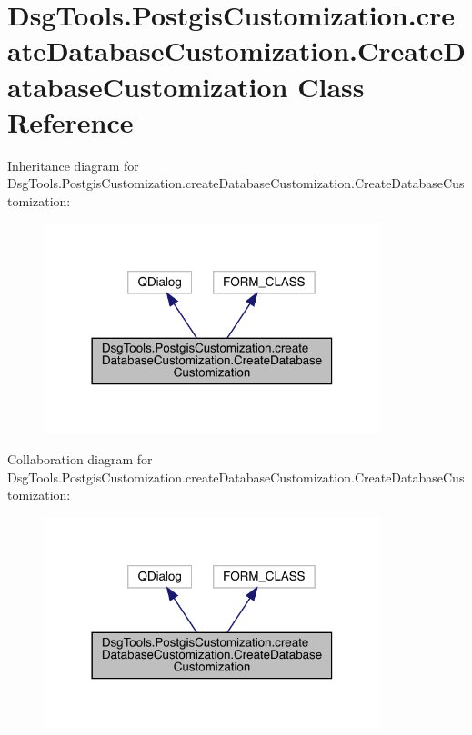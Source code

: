 \hypertarget{class_dsg_tools_1_1_postgis_customization_1_1create_database_customization_1_1_create_database_customization}{}\section{Dsg\+Tools.\+Postgis\+Customization.\+create\+Database\+Customization.\+Create\+Database\+Customization Class Reference}
\label{class_dsg_tools_1_1_postgis_customization_1_1create_database_customization_1_1_create_database_customization}


Inheritance diagram for Dsg\+Tools.\+Postgis\+Customization.\+create\+Database\+Customization.\+Create\+Database\+Customization\+:
\nopagebreak
\begin{figure}[H]
\begin{center}
\leavevmode
\includegraphics[width=278pt]{class_dsg_tools_1_1_postgis_customization_1_1create_database_customization_1_1_create_database_customization__inherit__graph}
\end{center}
\end{figure}


Collaboration diagram for Dsg\+Tools.\+Postgis\+Customization.\+create\+Database\+Customization.\+Create\+Database\+Customization\+:
\nopagebreak
\begin{figure}[H]
\begin{center}
\leavevmode
\includegraphics[width=278pt]{class_dsg_tools_1_1_postgis_customization_1_1create_database_customization_1_1_create_database_customization__coll__graph}
\end{center}
\end{figure}
